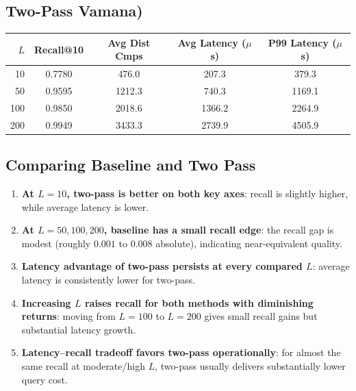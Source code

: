 \documentclass[11pt]{article}
\begin{document}
\subsection*{Two-Pass Vamana)}
\begin{center}
\begin{tabular}{@{}rcccc@{}}
\toprule
$L$ & Recall@10 & Avg Dist Cmps & Avg Latency ($\mu$s) & P99 Latency ($\mu$s) \\
\midrule
10  & 0.7780 & 476.0  & 207.3  & 379.3 \\
50  & 0.9595 & 1212.3 & 740.3  & 1169.1 \\
100 & 0.9850 & 2018.6 & 1366.2 & 2264.9 \\
200 & 0.9949 & 3433.3 & 2739.9 & 4505.9 \\
\bottomrule
\end{tabular}
\end{center}

\subsection*{Comparing Baseline and Two Pass}
\begin{enumerate}[leftmargin=*]
    \item \textbf{At $L=10$, two-pass is better on both key axes}: recall is slightly higher, while average latency is lower.
    \item \textbf{At $L=50,100,200$, baseline has a small recall edge}: the recall gap is modest (roughly $0.001$ to $0.008$ absolute), indicating near-equivalent quality.
    \item \textbf{Latency advantage of two-pass persists at every compared $L$}: average latency is consistently lower for two-pass.
    \item \textbf{Increasing $L$ raises recall for both methods with diminishing returns}: moving from $L=100$ to $L=200$ gives small recall gains but substantial latency growth.
    \item \textbf{Latency--recall tradeoff favors two-pass operationally}: for almost the same recall at moderate/high $L$, two-pass usually delivers substantially lower query cost.
\end{enumerate}
\end{document}
